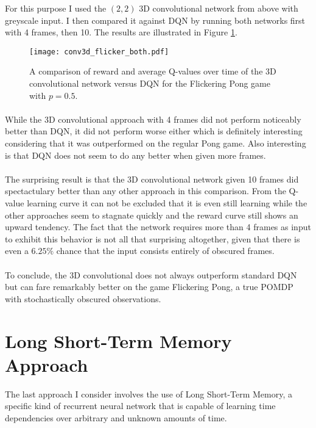 For this purpose I used the $(2,2)$ 3D convolutional network from above
with greyscale input.
I then compared it against DQN by running both
networks first with 4 frames, then 10.
The results are illustrated in Figure \ref{fig:conv3d_flicker_both}.

\begin{figure}[htpb]
  \centering
  \texttt{[image: conv3d\_flicker\_both.pdf]}
  \caption{
    A comparison
    of reward and average Q-values over time
    of the 3D convolutional network versus DQN
    for the Flickering Pong game with $p=0.5$.
  }
  \label{fig:conv3d_flicker_both}
\end{figure}

\paragraph{}
While the 3D convolutional approach with 4 frames did not perform noticeably
better than DQN,
it did not perform worse either
which is definitely interesting considering
that it was outperformed on the regular Pong game.
Also interesting is that DQN does not seem to do any better when given more frames.

\paragraph{}
The surprising result is that the 3D convolutional network given 10 frames
did spectactulary better than any other approach in this comparison.
From the Q-value learning curve it can not be excluded that it is
even still learning while the other approaches seem to stagnate quickly
and the reward curve still shows an upward tendency.
The fact that the network requires more than 4 frames as input
to exhibit this behavior is not all that surprising altogether,
given that there is even a $6.25\%$ chance
that the input consists entirely of obscured frames.

\paragraph{}
To conclude,
the 3D convolutional does not always outperform standard DQN
but can fare remarkably better
on the game Flickering Pong,
a true POMDP with stochastically obscured observations.



\section{Long Short-Term Memory Approach}
\label{sec:long_short_term_memory_approach}
The last approach I consider involves
the use of Long Short-Term Memory,
a specific kind of recurrent neural network
that is capable of learning time dependencies
over arbitrary and unknown amounts of time.

